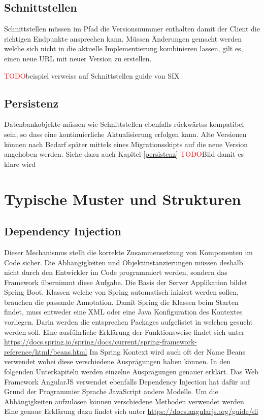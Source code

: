 \subsection{Schnittstellen}

Schnittstellen müssen im Pfad die Versionsnummer enthalten damit der Client die richtigen Endpunkte ansprechen kann. Müssen Änderungen gemacht werden welche sich nicht in die aktuelle Implementierung kombinieren lassen, gilt es, einen neue URL mit neuer Version zu erstellen.

\textcolor{red}{TODO}beispiel verweiss auf Schnittstellen guide von SIX

\subsection{Persistenz}

Datenbankobjekte müssen wie Schnittstellen ebenfalls rückwärtss kompatibel sein, so dass eine kontinuierliche Aktualisierung erfolgen kann. Alte Versionen können nach Bedarf später mittels eines Migrationsskipts auf die neue Version angehoben werden. Siehe dazu auch Kapitel \ref{persistenz}
\textcolor{red}{TODO}Bild damit es klare wird

\section{Typische Muster und Strukturen}

\subsection{Dependency Injection}

Dieser Mechanismus stellt die korrekte Zusammensetzung von Komponenten im Code sicher. Die Abhängigkeiten und Objektinstanzierungen  müssen deshalb nicht durch den Entwickler im Code programmiert werden, sondern das Framework übernimmt diese Aufgabe. Die Basis der Server Applikation bildet Spring Boot. Klassen welche von Spring automatisch iniziert werden sollen, brauchen die passande Annotation.
Damit Spring die Klassen beim Starten findet, muss entweder eine XML oder eine Java Konfiguration des Kontextes vorliegen. Darin werden die entsprechen Packages aufgelistet in welchen gesucht werden soll. Eine ausführliche Erklärung der Funktionsweise findet sich unter \url{https://docs.spring.io/spring/docs/current/spring-framework-reference/html/beans.html}\newline
Im Spring Kontext wird auch oft der Name Beans verwendet wobei diese verschiedene Ausprägungen haben können. In den folgenden Unterkapiteln werden einzelne Ausprägungen genauer erklärt.\newline
Das Web Framework AngularJS verwendet ebenfalls Dependency Injection hat dafür auf Grund der Programmier Sprache JavaScript andere Modelle. Um die Abhängigkeiten aufzulösen können verschiedene Methoden verwendet werden. Eine genaue Erklärung dazu findet sich unter \url{https://docs.angularjs.org/guide/di}

